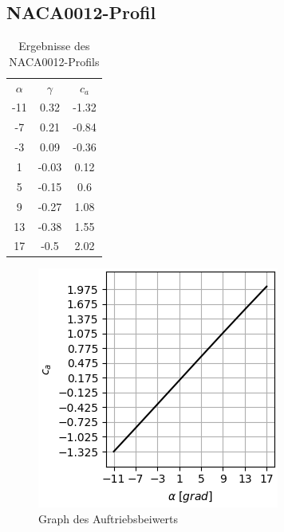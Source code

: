 \newpage
\subsection{NACA0012-Profil} 
\begin{minipage}{0.45\textwidth}
\begin{table}[H]
    \centering
    \begin{tabular}{c|cc}
    $\alpha$ & $\gamma$ & $c_a$ \\
        -11 & 0.32 & -1.32 \\ 
-7 & 0.21 & -0.84 \\ 
-3 & 0.09 & -0.36 \\ 
1 & -0.03 & 0.12 \\ 
5 & -0.15 & 0.6 \\ 
9 & -0.27 & 1.08 \\ 
13 & -0.38 & 1.55 \\ 
17 & -0.5 & 2.02 \\ 

    \end{tabular}
    \label{tab:naca}
    \caption{Ergebnisse des NACA0012-Profils}
\end{table}
\end{minipage}
\hfill
\begin{minipage}{0.45\textwidth}
\begin{figure}[H]
    \centering
    \includegraphics[scale=0.6]{figures/nacaca.png}
    \caption{Graph des Auftriebsbeiwerts}
    \label{fig:nacaca}
\end{figure}
\end{minipage}

